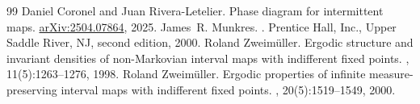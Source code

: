 \documentclass[10pt,a4paper]{amsart}
\numberwithin{equation}{section} %
\numberwithin{figure}{section} %
\renewcommand{\=}{\coloneqq}
\begin{document}
\begin{thebibliography}{99}
 Daniel Coronel and Juan Rivera-Letelier. \newblock Phase diagram for intermittent maps. \newblock \href{https://arxiv.org/abs/2504.07864} {arXiv:2504.07864}, 2025.
 James~R. Munkres. . \newblock Prentice Hall, Inc., Upper Saddle River, NJ, second edition, 2000.
 Roland Zweim\"uller. \newblock Ergodic structure and invariant densities of non-{M}arkovian interval maps with indifferent fixed points. , 11(5):1263--1276, 1998.
 Roland Zweim\"uller. \newblock Ergodic properties of infinite measure-preserving interval maps with indifferent fixed points. , 20(5):1519--1549, 2000.
\end{thebibliography}
\end{document}
